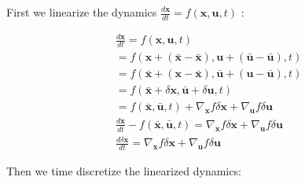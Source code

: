 \documentclass[11pt]{homework}
\renewcommand{\vec}[1]{\ensuremath{\boldsymbol{#1}}}
\begin{document}
\maketitle

\renewcommand{\questiontype}{Part}
\question

	\begin{arabicparts}
		\questionpart 
			
		First we linearize the dynamics $\frac{d\vec{x}}{dt} = f(\vec{x}, \vec{u}, t)$ :
			
			\begin{align*}
				& \frac{d\vec{x}}{dt} = f(\vec{x}, \vec{u}, t) \\
				& = f(\vec{x} + (\bar{\vec{x}} - \bar{\vec{x}}), \vec{u} + (\bar{\vec{u}} - \bar{\vec{u}}), t) \\
				& = f(\bar{\vec{x}} + (\vec{x} - \bar{\vec{x}}), \bar{\vec{u}} + (\vec{u} - \bar{\vec{u}}), t) \\
				& = f(\bar{\vec{x}} + \delta \vec{x}, \bar{\vec{u}} + \delta \vec{u}, t) \\
				& = f(\bar{\vec{x}}, \bar{\vec{u}}, t) + \nabla_{\vec{x}}f\delta\vec{x} +  \nabla_{\vec{u}}f\delta\vec{u} \\
				& \frac{d\vec{x}}{dt} - f(\bar{\vec{x}}, \bar{\vec{u}}, t) = \nabla_{\vec{x}}f\delta\vec{x} +  \nabla_{\vec{u}}f\delta\vec{u} \\
				& \frac{d\delta\vec{x}}{dt} = \nabla_{\vec{x}}f\delta\vec{x} +  \nabla_{\vec{u}}f\delta\vec{u} 
			\end{align*}
			
		Then we time discretize the linearized dynamics: 
		

\end{arabicparts}
\end{document}
